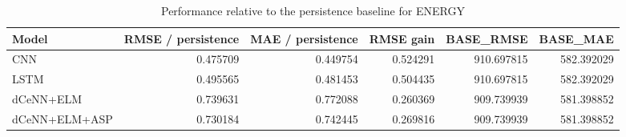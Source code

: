 \begin{table}
\caption{Performance relative to the persistence baseline for ENERGY}
\begin{tabular}{lrrrrr}
\toprule
Model & RMSE / persistence & MAE / persistence & RMSE gain & BASE\_RMSE & BASE\_MAE \\
\midrule
CNN & 0.475709 & 0.449754 & 0.524291 & 910.697815 & 582.392029 \\
LSTM & 0.495565 & 0.481453 & 0.504435 & 910.697815 & 582.392029 \\
dCeNN+ELM & 0.739631 & 0.772088 & 0.260369 & 909.739939 & 581.398852 \\
dCeNN+ELM+ASP & 0.730184 & 0.742445 & 0.269816 & 909.739939 & 581.398852 \\
\bottomrule
\end{tabular}
\end{table}
